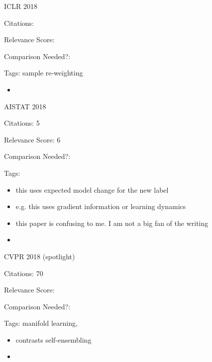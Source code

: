 \documentclass[11pt]{article}
\begin{document}
\vspace{2cm}

\noindent ICLR 2018

\noindent Citations: 

\noindent Relevance Score: 

\noindent Comparison Needed?: 

\noindent Tags: sample re-weighting

\begin{itemize}
\item
\end{itemize}


\vspace{2cm}

\noindent AISTAT 2018

\noindent Citations: 5

\noindent Relevance Score: 6

\noindent Comparison Needed?: 

\noindent Tags:

\begin{itemize}
\item this uses expected model change for the new label
\item e.g. this uses gradient information or learning dynamics
\item this paper is confusing to me. I am not a big fan of the writing
\item 
\end{itemize}




\vspace{2cm}


\noindent CVPR 2018 (spotlight)

\noindent Citations: 70

\noindent Relevance Score: 

\noindent Comparison Needed?: 

\noindent Tags: manifold learning, 

\begin{itemize}
\item contrasts self-ensembling
\item 
\end{itemize}

\vspace{2cm}
\end{document}

